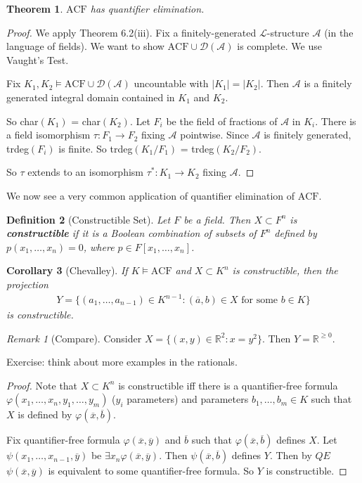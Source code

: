 \documentclass[]{article}
\theoremstyle{custhm}
\newtheorem{theorem}{Theorem}[section]
\theoremstyle{cusdef}
\newtheorem{defin}[theorem]{Definition}
\theoremstyle{custhm}
\theoremstyle{custhm}
\newtheorem{cor}[theorem]{Corollary}
\theoremstyle{custhm}
\theoremstyle{ex}
\theoremstyle{custhm}
\theoremstyle{cusdef}
\theoremstyle{remark}
\newtheorem*{remark*}{Remark}
\theoremstyle{remark}
\newcommand{\R}{\mathbb{R}}
\newcommand{\ra}{\rightarrow}
\newcommand{\undf}[1]{\textit{\textbf{#1}}}
\renewcommand{\L}{\mathcal{L}}
\renewcommand{\phi}{\varphi}
\renewcommand{\bar}{\overline}
\newcommand{\acf}{\textrm{ACF}}
\newcommand{\A}{\mathcal{A}}
\newcommand{\D}{\mathcal{D}}
\begin{document}
\begin{theorem}
$\acf$ has quantifier elimination.
\end{theorem}
\begin{proof}
We apply Theorem 6.2(iii). Fix a finitely-generated $\L$-structure $\A$ (in the language of fields). We want to show $\acf\cup \D(\A)$ is complete. We use Vaught's Test.

Fix $K_1,K_2\models\acf\cup \D(\A)$ uncountable with $|K_1| = |K_2|$. Then $\A$ is a finitely generated integral domain contained in $K_1$ and $K_2$.

So char$(K_1)$ = char\((K_2)\). Let $F_i$ be the field of fractions of $\A$ in $K_i$. There is a field isomorphism $\tau : F_1\ra F_2$ fixing $\A$ pointwise. Since $\A$ is finitely generated, trdeg$(F_i)$ is finite. So trdeg$(K_1/F_1)$ = trdeg$(K_2/F_2)$.

So $\tau$ extends to an isomorphism $\tau^\ast: K_1\ra K_2$ fixing $\A$.
\end{proof}
We now see a very common application of quantifier elimination of $\acf$.

\begin{defin}[Constructible Set]
Let $F$ be a field. Then $X\subset F^n$ is \undf{constructible} if it is a Boolean combination of subsets of $F^n$ defined by $p(x_1,\dots,x_n) = 0$, where $p \in F[x_1,\dots,x_n]$.
\end{defin}
\begin{cor}[Chevalley]
If $K\models \acf$ and $X\subset K^n$ is constructible, then the projection
\begin{align*}
Y = \{(a_1,\dots,a_{n-1})\in K^{n-1}:(\overline{a},b)\in X\textrm{ for some }b\in K\}
\end{align*}
is constructible.
\end{cor}

\begin{remark*}[Compare]
Consider $X = \{(x,y)\in \R^2:x = y^2\}$. Then $Y = \R^{\ge 0}$.

Exercise: think about more examples in the rationals.
\end{remark*}
\begin{proof}
Note that $X\subset K^n$ is constructible iff there is a quantifier-free formula $\phi(x_1,\dots,x_n,y_1,\dots,y_m)$ ($y_i$ parameters) and parameters $b_1,\dots,b_m\in K$ such that $X$ is defined by $\phi(\bar{x},\bar{b})$.

Fix quantifier-free formula $\phi(\bar{x},\bar{y})$ and $\bar{b}$ such that $\phi(\bar{x},\bar{b})$ defines $X$. Let $\psi(x_1,\dots,x_{n-1},\bar{y})$ be $\exists x_n\phi(\bar{x},\bar{y})$. Then $\psi(\bar{x},\bar{b})$ defines $Y$. Then by $QE$ $\psi(\bar{x},\bar{y})$ is equivalent to some quantifier-free formula. So $Y$ is constructible.
\end{proof}
\end{document}
